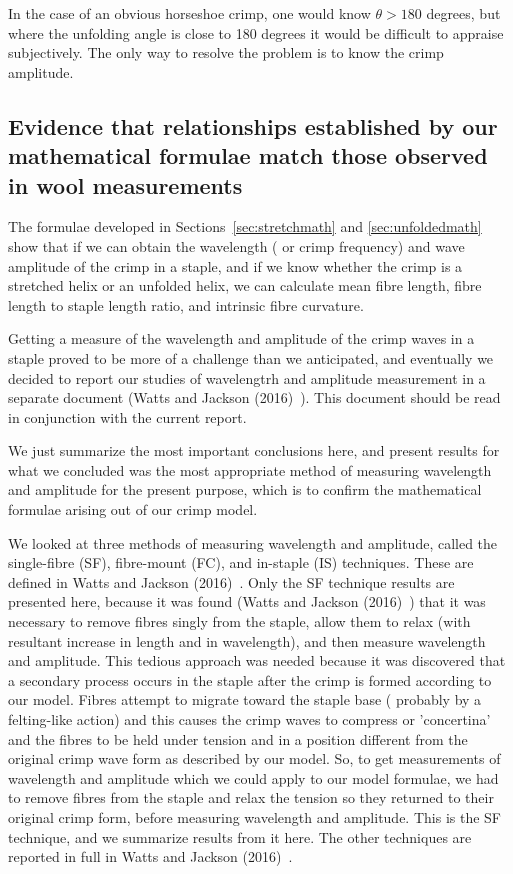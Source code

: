 \documentclass[titlepage,10pt]{article}  %
\begin{document}
In the case of an obvious horseshoe crimp, one would  know $\theta>180$ degrees,  but where the unfolding angle is close to 180 degrees it would be difficult to appraise subjectively.  The only way to resolve the problem is to know the crimp amplitude.

\subsection{Evidence that relationships established by our mathematical formulae match those observed in wool measurements}
 The formulae developed in Sections~\ref{sec:stretchmath} and \ref{sec:unfoldedmath} show that if we can obtain the wavelength ( or crimp frequency) and wave amplitude of the crimp in a staple, and if we know whether the crimp is a stretched helix or an unfolded helix, we can calculate mean fibre length, fibre length to staple length ratio, and intrinsic fibre curvature. 

Getting a measure of the wavelength and amplitude of the crimp waves in a staple proved to be more of a challenge than we anticipated,  and eventually we decided to report our studies of wavelengtrh and amplitude measurement in a separate document (Watts and Jackson (2016)~\cite{watt:16}).  This document should be read in conjunction with the current report.

We just summarize the most important conclusions here, and present results for what we concluded was the most appropriate  method of measuring wavelength and amplitude for the present purpose, which is to confirm the mathematical formulae arising out of our crimp model.

We looked at three methods of measuring wavelength and amplitude, called the single-fibre (SF), fibre-mount (FC), and in-staple (IS) techniques.  These are defined in Watts and Jackson (2016)~\cite{watt:16}. Only the SF technique results are presented here, because it was found (Watts and Jackson (2016)~\cite{watt:16}) that it was necessary to remove fibres singly from the staple, allow them to relax (with resultant increase in length and in wavelength), and then measure wavelength and amplitude.  This tedious approach was needed because it was discovered that a secondary process occurs in the staple after the crimp is formed according to our model. Fibres attempt to migrate toward the staple base ( probably by a felting-like action) and this causes the crimp waves to compress or 'concertina' and the fibres to be held under tension and in a position different from the original crimp wave form as described by our model. So, to get measurements of wavelength and amplitude which we could apply to our model formulae, we had to remove fibres from the staple and relax the tension so they returned to their original crimp form, before measuring wavelength and amplitude. This is the SF technique, and we summarize results from it here. The other techniques are reported in full in Watts and Jackson (2016)~\cite{watt:16}.
\end{document}
